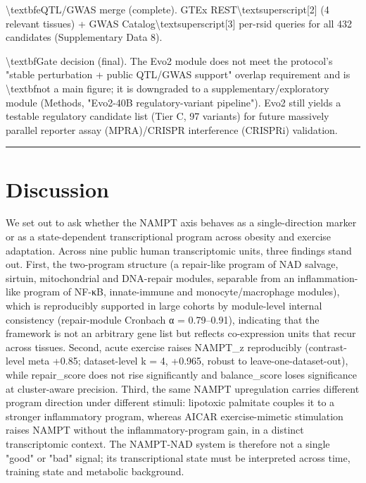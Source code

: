 \documentclass[11pt]{article}
\begin{document}
\textbackslash{}textbf{eQTL/GWAS merge (complete).} GTEx REST\textbackslash{}textsuperscript{[2]} (4 relevant tissues) + GWAS Catalog\textbackslash{}textsuperscript{[3]} per-rsid queries for all 432 candidates (Supplementary Data 8).

\textbackslash{}textbf{Gate decision (final).} The Evo2 module does not meet the protocol's "stable perturbation + public QTL/GWAS support" overlap requirement and is \textbackslash{}textbf{not a main figure}; it is downgraded to a supplementary/exploratory module (Methods, "Evo2-40B regulatory-variant pipeline"). Evo2 still yields a testable regulatory candidate list (Tier C, 97 variants) for future massively parallel reporter assay (MPRA)/CRISPR interference (CRISPRi) validation.

\vspace{4pt}\hrule\vspace{8pt}
\section*{Discussion}
We set out to ask whether the NAMPT axis behaves as a single-direction marker or as a state-dependent transcriptional program across obesity and exercise adaptation. Across nine public human transcriptomic units, three findings stand out. First, the two-program structure (a repair-like program of NAD salvage, sirtuin, mitochondrial and DNA-repair modules, separable from an inflammation-like program of NF-κB, innate-immune and monocyte/macrophage modules), which is reproducibly supported in large cohorts by module-level internal consistency (repair-module Cronbach α = 0.79–0.91), indicating that the framework is not an arbitrary gene list but reflects co-expression units that recur across tissues. Second, acute exercise raises NAMPT\_z reproducibly (contrast-level meta +0.85; dataset-level k = 4, +0.965, robust to leave-one-dataset-out), while repair\_score does not rise significantly and balance\_score loses significance at cluster-aware precision. Third, the same NAMPT upregulation carries different program direction under different stimuli: lipotoxic palmitate couples it to a stronger inflammatory program, whereas AICAR exercise-mimetic stimulation raises NAMPT without the inflammatory-program gain, in a distinct transcriptomic context. The NAMPT-NAD system is therefore not a single "good" or "bad" signal; its transcriptional state must be interpreted across time, training state and metabolic background.
\end{document}
